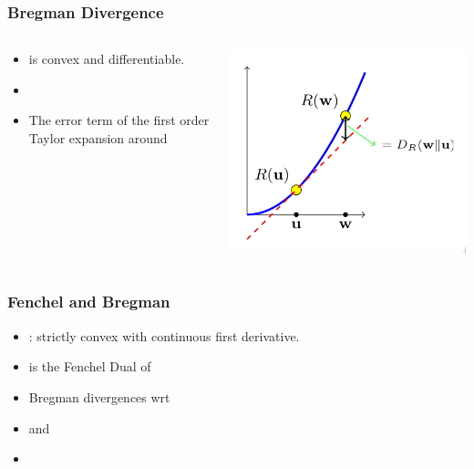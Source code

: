 \documentclass{beamer}
\begin{document}
\begin{small}
 \begin{frame}
    \frametitle{Bregman Divergence}
   \begin{columns}
     \begin{column}{0.55\textwidth}
       \begin{itemize}
       \item {} is convex and differentiable.
       \item {}
       \item The error term of the first order Taylor expansion around 
       \end{itemize}
     \end{column}
      \begin{column}{0.43\textwidth}
        \includegraphics[width=\textwidth]{figures/BregmanDivergence.png}
      \end{column}
    \end{columns}
  \end{frame}
 
\begin{frame}
  \frametitle{Fenchel and Bregman}
  \begin{itemize}
  \item
    : strictly convex with continuous first derivative.
  \item {} is the Fenchel Dual of 
  \item {} Bregman divergences wrt 
  \item {} and 
  \item {}
  \end{itemize}
\end{frame}


\end{small}
\end{document}
